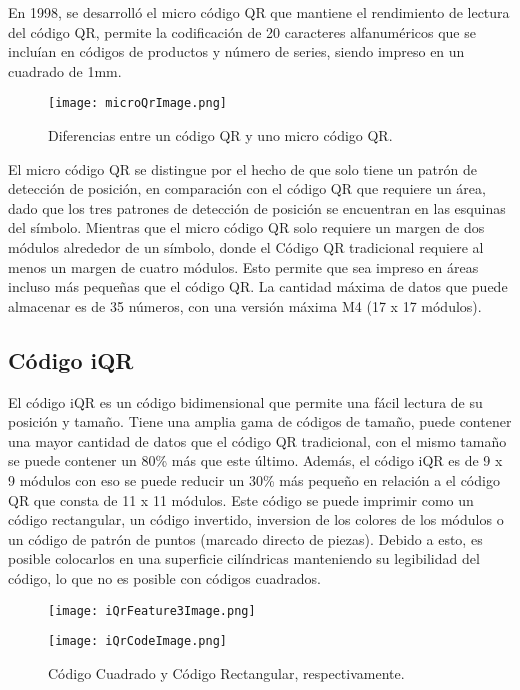 En 1998, se desarrolló el micro código QR que mantiene el rendimiento de lectura del código QR, permite la codificación de 20 caracteres alfanuméricos que se incluían en códigos de productos y número de series, siendo impreso en un cuadrado de 1mm.\cite{2019_Hara}
\begin{figure} 
	\centering
	\texttt{[image: microQrImage.png]}
	\caption{Diferencias entre un código QR y uno micro código QR.}
	\label{fig:microQR}
\end{figure}
El micro código QR se distingue por el hecho de que solo tiene un patrón de detección de posición, en comparación con el código QR que requiere un área, dado que los tres patrones de detección de posición se encuentran en las esquinas del símbolo. Mientras que el micro código QR solo requiere un margen de dos módulos alrededor de un símbolo, donde el Código QR tradicional requiere al menos un margen de cuatro módulos. Esto permite que sea impreso en áreas incluso más pequeñas que el código QR. La cantidad máxima de datos que puede almacenar es de 35 números, con una versión máxima M4 (17 x 17 módulos).\cite{qrcode2021}



\subsection{Código iQR}
El código iQR es un código bidimensional que permite una fácil lectura de su posición y tamaño. Tiene una amplia gama de códigos de tamaño, puede contener una mayor cantidad de datos que el código QR tradicional, con el mismo tamaño se puede contener un 80\% más que este último. Además, el código iQR es de 9 x 9 módulos con eso se puede reducir un 30\% más pequeño en relación a el código QR que consta de 11 x 11 módulos. Este código se puede imprimir como un código rectangular, un código invertido, inversion de los colores de los módulos o un código de patrón de puntos (marcado directo de piezas). Debido a esto, es posible colocarlos en una superficie cilíndricas manteniendo su legibilidad del código, lo que no es posible con códigos cuadrados.\cite{qrcode2021}
\begin{figure} 
	\centering
	\texttt{[image: iQrFeature3Image.png]}
	\label{fig:iqr}
\end{figure}
\begin{figure} 
	\centering
	\texttt{[image: iQrCodeImage.png]}
	\caption{Código Cuadrado y Código Rectangular, respectivamente.}
	\label{fig:iqr2}
\end{figure}

